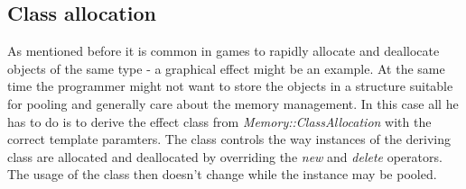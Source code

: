 \subsection{Class allocation}
As mentioned before it is common in games to rapidly allocate and deallocate objects of the same type - a graphical effect might be an example. At the same time the programmer might not want to store the objects in a structure suitable for pooling and generally care about the memory management. In this case all he has to do is to derive the effect class from \emph{Memory::ClassAllocation} with the correct template paramters. The class controls the way instances of the deriving class are allocated and deallocated by overriding the \emph{new} and \emph{delete} operators. The usage of the class then doesn't change while the instance may be pooled.



%


